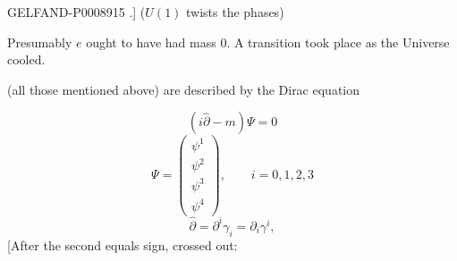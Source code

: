 \begin{GelfandAdjacentEvidence}{GELFAND-P000891}{5}
.] ($U(1)$ twists the phases)

Presumably $e$ ought to have had mass $0$. A transition took place as the Universe cooled.

 (all those mentioned above) are described by the Dirac equation

\begin{equation*}
(i\hat\partial-m)\Psi=0 \tag{1}
\end{equation*}
\[
\Psi=\begin{pmatrix}\psi^1\\\psi^2\\\psi^3\\\psi^4\end{pmatrix},
\qquad i=0,1,2,3
\]
\begin{equation*}
\hat\partial=\partial^i\gamma_i=\partial_i\gamma^i, \tag{2}
\end{equation*}
[After the second equals sign, crossed out: 
\end{GelfandAdjacentEvidence}
